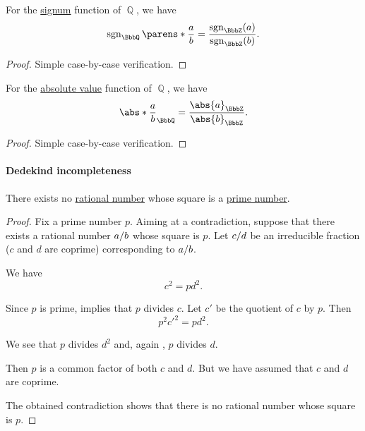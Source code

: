 \begin{proposition}\label{thm:rational_number_signum}\mimprovised
  For the \hyperref[def:totally_ordered_ring_signum]{signum} function of \( \BbbQ \), we have
  \begin{equation*}
    \sgn_\BbbQ\parens*{ \frac a b } = \frac {\sgn_\BbbZ(a)} {\sgn_\BbbZ(b)}.
  \end{equation*}
\end{proposition}
\begin{proof}
  Simple case-by-case verification.
\end{proof}

\begin{proposition}\label{thm:rational_number_absolute_value}\mimprovised
  For the \hyperref[def:totally_ordered_ring_absolute_value]{absolute value} function of \( \BbbQ \), we have
  \begin{equation*}
    \abs*{ \frac a b }_\BbbQ = \frac {\abs{a}_\BbbZ} {\abs{b}_\BbbZ}.
  \end{equation*}
\end{proposition}
\begin{proof}
  Simple case-by-case verification.
\end{proof}

\paragraph{Dedekind incompleteness}

\begin{proposition}\label{thm:sqrt_p_is_not_rational}
  There exists no \hyperref[def:rational_numbers]{rational number} whose square is a \hyperref[def:prime_number]{prime number}.
\end{proposition}
\begin{proof}
  Fix a prime number \( p \). Aiming at a contradiction, suppose that there exists a rational number \( \ifrac a b \) whose square is \( p \). Let \( \ifrac c d \) be an irreducible fraction (\( c \) and \( d \) are coprime) corresponding to \( \ifrac a b \).

  We have
  \begin{equation*}
    c^2 = p d^2.
  \end{equation*}

  Since \( p \) is prime,  implies that \( p \) divides \( c \). Let \( c' \) be the quotient of \( c \) by \( p \). Then
  \begin{equation*}
    p^2 c'^2 = p d^2.
  \end{equation*}

  We see that \( p \) divides \( d^2 \) and, again , \( p \) divides \( d \).

  Then \( p \) is a common factor of both \( c \) and \( d \). But we have assumed that \( c \) and \( d \) are coprime.

  The obtained contradiction shows that there is no rational number whose square is \( p \).
\end{proof}

